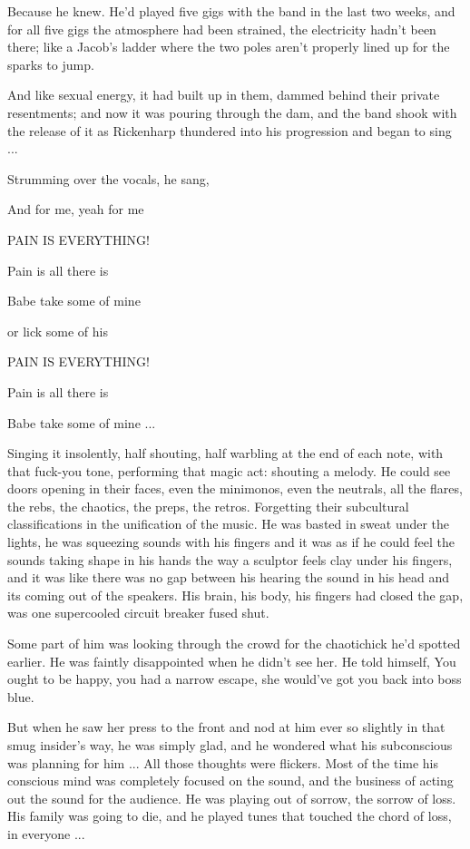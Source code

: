 Because he knew. He'd played five gigs with the band in the last two weeks, and for all five gigs the atmosphere had been strained, the electricity hadn't been there; like a Jacob's ladder where the two poles aren't properly lined up for the sparks to jump.

And like sexual energy, it had built up in them, dammed behind their private resentments; and now it was pouring through the dam, and the band shook with the release of it as Rickenharp thundered into his progression and began to sing ...

Strumming over the vocals, he sang,

And for me, yeah for me

PAIN IS EVERYTHING!

Pain is all there is

Babe take some of mine

or lick some of his

PAIN IS EVERYTHING!

Pain is all there is

Babe take some of mine ...

Singing it insolently, half shouting, half warbling at the end of each note, with that fuck-you tone, performing that magic act: shouting a melody. He could see doors opening in their faces, even the minimonos, even the neutrals, all the flares, the rebs, the chaotics, the preps, the retros. Forgetting their subcultural classifications in the unification of the music. He was basted in sweat under the lights, he was squeezing sounds with his fingers and it was as if he could feel the sounds taking shape in his hands the way a sculptor feels clay under his fingers, and it was like there was no gap between his hearing the sound in his head and its coming out of the speakers. His brain, his body, his fingers had closed the gap, was one supercooled circuit breaker fused shut.

Some part of him was looking through the crowd for the chaotichick he'd spotted earlier. He was faintly disappointed when he didn't see her. He told himself, You ought to be happy, you had a narrow escape, she would've got you back into boss blue.

But when he saw her press to the front and nod at him ever so slightly in that smug insider's way, he was simply glad, and he wondered what his subconscious was planning for him ... All those thoughts were flickers. Most of the time his conscious mind was completely focused on the sound, and the business of acting out the sound for the audience. He was playing out of sorrow, the sorrow of loss. His family was going to die, and he played tunes that touched the chord of loss, in everyone ...

